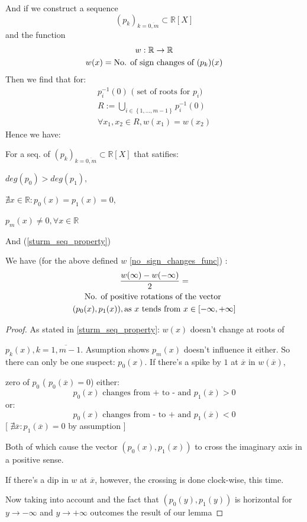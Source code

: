 And if we construct a sequence
\[
(p_k)_{k = \overline{0,m}} \subset \mathbb{R}[X]
\]
and the function
\begin{gather}\label{no_sign_changes_func}
w : \mathbb{R} \rightarrow \mathbb{R} \notag  \\
w(x) = \text{No. of sign changes of  } (p_k)(x) \notag
\end{gather}
Then we find that for:
\begin{gather*}
p_i^{-1}(0) \text{ ( set of roots for $p_i$) } \\
R := \bigcup_{i \in \left\{ 1, \dots, m-1 \right\} } p_i^{-1}(0) \\
\forall x_1, x_2 \in R, w(x_1) = w(x_2)
\end{gather*}
Hence we have:
\begin{lemma}\label{sturm_lemma}
For a seq. of $  (p_k)_{k = \overline{0,m}} \subset \mathbb{R}[X]$
that satifies:

$ deg(p_0) > deg(p_1), $

$\nexists x \in \mathbb{R} : p_0(x) = p_1(x) = 0, $

$p_m(x) \neq 0, \forall x \in \mathbb{R}$

And (\ref{sturm_seq_property})
\par
We have (for the above defined $w$ \ref{no_sign_changes_func}) :
\begin{gather}
	\frac{w(\infty) - w(-\infty)}{2} =  \notag \\
	\text{No. of positive rotations of the vector } \notag \\
	(p_0(x), p_1(x)), \text{as $x$ tends from  } x \in [-\infty, +\infty] \notag
\end{gather}
\end{lemma}

\begin{proof}

As stated in \ref{sturm_seq_property}: $w(x)$ doesn't change at roots of

$p_k(x), k = \overline{1,m-1}$. Asumption  shows $p_m(x)$
doesn't influence it either. So there can only be one suspect:
$p_0(x)$. If there's a spike by $1$ at $\overline{x}$ in $w(\overline{x})$,

zero of $p_0$
(   $p_0(\overline{x}) =0 $) either:
\[
	p_0(x) \text{ changes from + to - and   } p_1(\overline{x}) > 0
\]
or:
\[
	p_0(x) \text{ changes from - to + and  } p_1(\overline{x}) < 0
\]
[   $\nexists \overline{x}: p_1(\overline{x}) = 0$ by assumption   ]

Both of which cause the vector $(p_0(x), p_1(x))$ to cross the
imaginary axis in a positive sense.

If there's a dip in $w$ at $\overline{x}$, however, the crossing is
done clock-wise, this time.

Now taking  into account and the fact that $(p_0(y), p_1(y))$
is horizontal for $y \rightarrow  - \infty$ and $y \rightarrow +
\infty  $ outcomes the result of our lemma
\end{proof}

